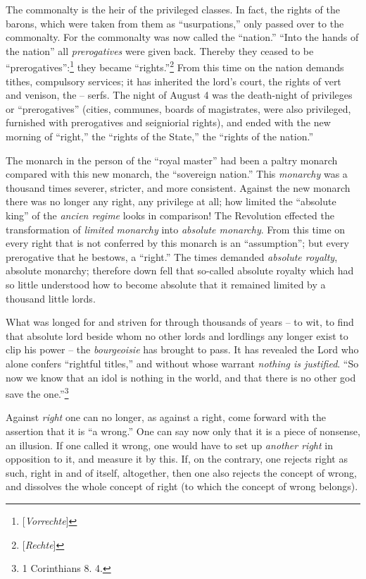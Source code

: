 \documentclass[12pt,a4paper]{book}
\begin{document}
The commonalty is the heir of the privileged classes. In fact, the rights of 
the barons, which were taken from them as ``usurpations,'' only passed over 
to the commonalty. For the commonalty was now called the ``nation.'' ``Into 
the hands of the nation'' all \textit{prerogatives} were given back. Thereby 
they ceased to be ``prerogatives'':\footnote{[\textit{Vorrechte}]} they 
became ``rights.''\footnote{[\textit{Rechte}]} From this time on the nation 
demands tithes, compulsory services; it has inherited the lord's court, the 
rights of vert and venison, the -- serfs. The night of August 4 was the 
death-night of privileges or ``prerogatives'' (cities, communes, boards of 
magistrates, were also privileged, furnished with prerogatives and seigniorial 
rights), and ended with the new morning of ``right,'' the ``rights of the 
State,'' the ``rights of the nation.''

The monarch in the person of the ``royal master'' had been a paltry monarch 
compared with this new monarch, the ``sovereign nation.'' This 
\textit{monarchy} was a thousand times severer, stricter, and more consistent. 
Against the new monarch there was no longer any right, any privilege at all; 
how limited the ``absolute king'' of the \textit{ancien regime} looks in 
comparison! The Revolution effected the transformation of \textit{limited 
monarchy} into \textit{absolute monarchy}. From this time on every right that 
is not conferred by this monarch is an ``assumption''; but every prerogative 
that he bestows, a ``right.'' The times demanded \textit{absolute royalty}, 
absolute monarchy; therefore down fell that so-called absolute royalty which 
had so little understood how to become absolute that it remained limited by a 
thousand little lords.

What was longed for and striven for through thousands of years -- to wit, to 
find that absolute lord beside whom no other lords and lordlings any longer 
exist to clip his power -- the \textit{bourgeoisie} has brought to pass. It 
has revealed the Lord who alone confers ``rightful titles,'' and without 
whose warrant \textit{nothing is justified}. ``So now we know that an idol is 
nothing in the world, and that there is no other god save the 
one.''\footnote{1 Corinthians 8. 4.}

Against \textit{right} one can no longer, as against a right, come forward 
with the assertion that it is ``a wrong.'' One can say now only that it is a 
piece of nonsense, an illusion. If one called it wrong, one would have to set 
up \textit{another right} in opposition to it, and measure it by this. If, on 
the contrary, one rejects right as such, right in and of itself, altogether, 
then one also rejects the concept of wrong, and dissolves the whole concept of 
right (to which the concept of wrong belongs).
\end{document}
